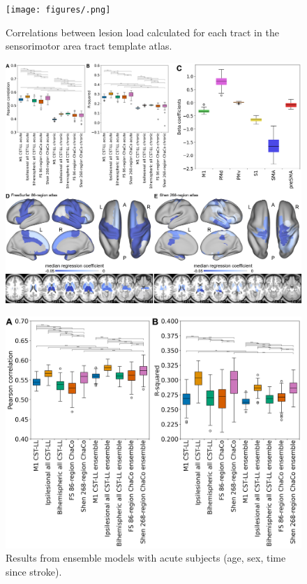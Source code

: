 \documentclass[10pt]{article}
\begin{document}
\begin{figure}[ht]
\centering
\texttt{[image: figures/.png]}
\caption{Correlations between lesion load calculated for each tract in the sensorimotor area tract template atlas.}
\label{smatt_pairwise_correlations}
\end{figure}


\begin{figure}[ht]
\centering
\includegraphics[width=1\linewidth]{figures/Analysis6.png}
\caption{}
\label{smatt_pairwise_correlations}
\end{figure}




\begin{figure}[ht]
\centering
\includegraphics[width=1\linewidth]{figures/Analysis7.png}
\caption{Results from ensemble models with acute subjects (age, sex, time since stroke).}
\label{smatt_pairwise_correlations}
\end{figure}
\end{document}
